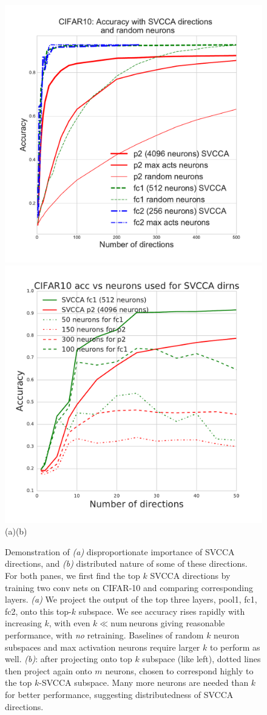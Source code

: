 \documentclass{article} %
\begin{document}
\begin{figure}[t]
  \centering
  \includegraphics[width=0.45\columnwidth]{figures_nips/CIFAR10_directions_importance_new.pdf}
  \includegraphics[width=0.45\columnwidth]{figures_nips/CIFAR10_directions_distributed.pdf} \\
  \vspace*{-.03\columnwidth}
  (a)\hspace{.45\columnwidth}(b)
  \caption{\small Demonstration of {\em (a)} disproportionate importance of SVCCA directions, and {\em (b)} distributed nature of some of these directions. For both panes, we first find the top $k$ SVCCA directions by training two conv nets on CIFAR-10 and comparing corresponding layers. {\em (a)} We project the output of the top three layers, pool1, fc1, fc2, onto this top-$k$ subspace. We see accuracy rises rapidly with increasing $k$, with even $k \ll \mathrm{num~neurons}$ giving reasonable performance, with \textit{no} retraining. Baselines of random $k$ neuron subspaces and max activation neurons require larger $k$ to perform as well. {\em (b)}: after projecting onto top $k$ subspace (like left), dotted lines then project again onto $m$ neurons, chosen to correspond highly to the top $k$-SVCCA subspace. Many more neurons are needed than $k$ for better performance, suggesting distributedness of SVCCA directions.}
  \vspace*{-1.4em}
  \label{fig-SVCCA-distributed}
\end{figure}
\end{document}
